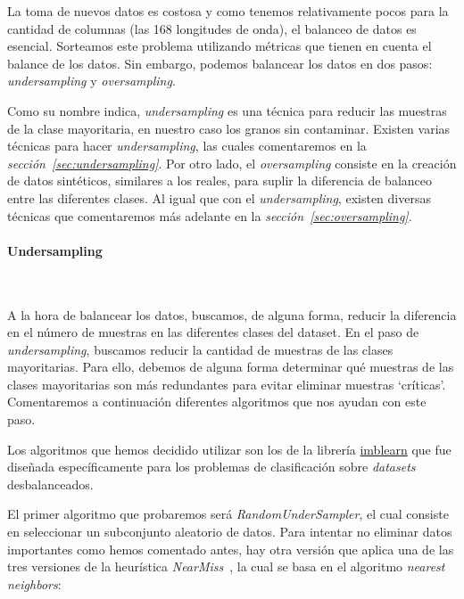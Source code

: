 La toma de nuevos datos es costosa y como tenemos relativamente pocos para la cantidad de columnas (las 168 longitudes de onda), el balanceo de datos es esencial. Sorteamos este problema utilizando métricas que tienen en cuenta el balance de los datos. Sin embargo, podemos balancear los datos en dos pasos: \textit{undersampling} y \textit{oversampling}. 

Como su nombre indica, \textit{undersampling} es una técnica para reducir las muestras de la clase mayoritaria, en nuestro caso los granos sin contaminar. Existen varias técnicas para hacer \textit{undersampling}, las cuales comentaremos en la \textit{sección\ \ref{sec:undersampling}}. Por otro lado, el \textit{oversampling} consiste en la creación de datos sintéticos, similares a los reales, para suplir la diferencia de balanceo entre las diferentes clases. Al igual que con el \textit{undersampling}, existen diversas técnicas que comentaremos más adelante en la \textit{sección\ \ref{sec:oversampling}}.

\paragraph{Undersampling}\ \label{sec:undersampling}


A la hora de balancear los datos, buscamos, de alguna forma, reducir la diferencia en el número de muestras en las diferentes clases del dataset. En el paso de \textit{undersampling}, buscamos reducir la cantidad de muestras de las clases mayoritarias. Para ello, debemos de alguna forma determinar qué muestras de las clases mayoritarias son más redundantes para evitar eliminar muestras `críticas'. Comentaremos a continuación diferentes algoritmos que nos ayudan con este paso.

Los algoritmos que hemos decidido utilizar son los de la librería \href{https://imbalanced-learn.org/stable/}{imblearn} que fue diseñada específicamente para los problemas de clasificación sobre \textit{datasets} desbalanceados.\ \cite{3Undersa98:online}

El primer algoritmo que probaremos será \textit{RandomUnderSampler}, el cual consiste en seleccionar un subconjunto aleatorio de datos. Para intentar no eliminar datos importantes como hemos comentado antes, hay otra versión que aplica una de las tres versiones de la heurística \textit{NearMiss}\ \cite{3Undersa98:online}, la cual se basa en el algoritmo \textit{nearest neighbors}:

